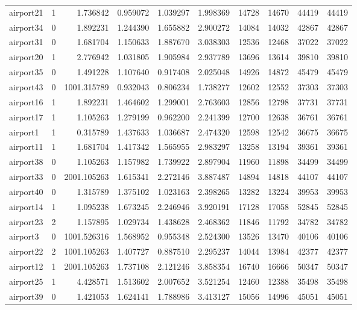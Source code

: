 \begin{longtable}{|l|r|r|r|r|r|r|r|r|r|}
airport21 & 1 & 1.736842 & 0.959072 & 1.039297 & 1.998369 & 14728 & 14670 & 44419 & 44419 \\
airport34 & 0 & 1.892231 & 1.244390 & 1.655882 & 2.900272 & 14084 & 14032 & 42867 & 42867 \\
airport31 & 0 & 1.681704 & 1.150633 & 1.887670 & 3.038303 & 12536 & 12468 & 37022 & 37022 \\
airport20 & 1 & 2.776942 & 1.031805 & 1.905984 & 2.937789 & 13696 & 13614 & 39810 & 39810 \\
airport35 & 0 & 1.491228 & 1.107640 & 0.917408 & 2.025048 & 14926 & 14872 & 45479 & 45479 \\
airport43 & 0 & 1001.315789 & 0.932043 & 0.806234 & 1.738277 & 12602 & 12552 & 37303 & 37303 \\
airport16 & 1 & 1.892231 & 1.464602 & 1.299001 & 2.763603 & 12856 & 12798 & 37731 & 37731 \\
airport17 & 1 & 1.105263 & 1.279199 & 0.962200 & 2.241399 & 12700 & 12638 & 36761 & 36761 \\
airport1 & 1 & 0.315789 & 1.437633 & 1.036687 & 2.474320 & 12598 & 12542 & 36675 & 36675 \\
airport11 & 1 & 1.681704 & 1.417342 & 1.565955 & 2.983297 & 13258 & 13194 & 39361 & 39361 \\
airport38 & 0 & 1.105263 & 1.157982 & 1.739922 & 2.897904 & 11960 & 11898 & 34499 & 34499 \\
airport33 & 0 & 2001.105263 & 1.615341 & 2.272146 & 3.887487 & 14894 & 14818 & 44107 & 44107 \\
airport40 & 0 & 1.315789 & 1.375102 & 1.023163 & 2.398265 & 13282 & 13224 & 39953 & 39953 \\
airport14 & 1 & 1.095238 & 1.673245 & 2.246946 & 3.920191 & 17128 & 17058 & 52845 & 52845 \\
airport23 & 2 & 1.157895 & 1.029734 & 1.438628 & 2.468362 & 11846 & 11792 & 34782 & 34782 \\
airport3 & 0 & 1001.526316 & 1.568952 & 0.955348 & 2.524300 & 13526 & 13470 & 40106 & 40106 \\
airport22 & 2 & 1001.105263 & 1.407727 & 0.887510 & 2.295237 & 14044 & 13984 & 42377 & 42377 \\
airport12 & 1 & 2001.105263 & 1.737108 & 2.121246 & 3.858354 & 16740 & 16666 & 50347 & 50347 \\
airport25 & 1 & 4.428571 & 1.513602 & 2.007652 & 3.521254 & 12460 & 12388 & 35498 & 35498 \\
airport39 & 0 & 1.421053 & 1.624141 & 1.788986 & 3.413127 & 15056 & 14996 & 45051 & 45051 \\

\end{longtable}
